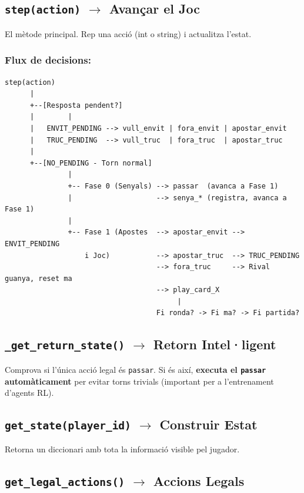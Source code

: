 \documentclass[a4paper,11pt]{report}
\begin{document}
\subsection{\texttt{step(action)} $\rightarrow$ Avançar el Joc}

El mètode principal. Rep una acció (int o string) i actualitza l'estat.

\subsubsection{Flux de decisions:}

\begin{samepage}
\begin{verbatim}
step(action)
      |
      +--[Resposta pendent?]
      |        |
      |   ENVIT_PENDING --> vull_envit | fora_envit | apostar_envit
      |   TRUC_PENDING  --> vull_truc  | fora_truc  | apostar_truc
      |
      +--[NO_PENDING - Torn normal]
               |
               +-- Fase 0 (Senyals) --> passar  (avanca a Fase 1)
               |                    --> senya_* (registra, avanca a Fase 1)
               |
               +-- Fase 1 (Apostes  --> apostar_envit --> ENVIT_PENDING
                   i Joc)           --> apostar_truc  --> TRUC_PENDING
                                    --> fora_truc     --> Rival guanya, reset ma
                                    --> play_card_X
                                         |
                                    Fi ronda? -> Fi ma? -> Fi partida?
\end{verbatim}
\end{samepage}

\subsection{\texttt{\_get\_return\_state()} $\rightarrow$ Retorn Intel·ligent}

Comprova si l'única acció legal és \texttt{passar}. Si és així, \textbf{executa el \texttt{passar} automàticament} per evitar torns trivials (important per a l'entrenament d'agents RL).

\subsection{\texttt{get\_state(player\_id)} $\rightarrow$ Construir Estat}

Retorna un diccionari amb tota la informació visible pel jugador.

\subsection{\texttt{get\_legal\_actions()} $\rightarrow$ Accions Legals}
\end{document}
